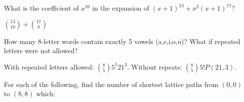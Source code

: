 \begin{questions}
	

\question What is the coefficient of $x^{10}$ in the expansion of $(x+1)^{13} + x^2(x+1)^{17}$?

	\begin{answer}
		${13 \choose 10} + {17 \choose 8}$
	\end{answer}
	
	


\question How many 8-letter words contain exactly 5 vowels (a,e,i,o,u)?  What if repeated letters were not allowed?

	\begin{answer}
		 With repeated letters allowed: ${8 \choose 5}5^5 21^3$.  Without repeats: ${8 \choose 5}5! P(21, 3)$.
	\end{answer}
	
	


\question For each of the following, find the number of shortest lattice paths from $(0,0)$ to $(8,8)$ which:

	\begin{answer}
	\end{answer}
	

\end{questions}
